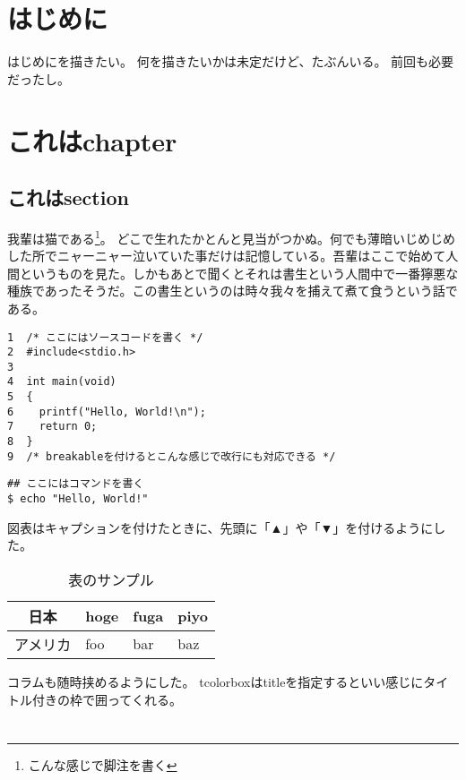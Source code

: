 \documentclass[11pt,dvipdfmx,b5paper,oneside]{jsbook}
\begin{document}
\chapter*{はじめに}
はじめにを描きたい。
何を描きたいかは未定だけど、たぶんいる。
前回も必要だったし。

\tableofcontents
\clearpage

\chapter{これはchapter}
\section{これはsection}
我輩は猫である\footnote{こんな感じで脚注を書く}。
どこで生れたかとんと見当がつかぬ。何でも薄暗いじめじめした所でニャーニャー泣いていた事だけは記憶している。吾輩はここで始めて人間というものを見た。しかもあとで聞くとそれは書生という人間中で一番獰悪な種族であったそうだ。この書生というのは時々我々を捕えて煮て食うという話である。
\begin{tcolorbox}[breakable]
\begin{verbatim}
1  /* ここにはソースコードを書く */
2  #include<stdio.h>
3
4  int main(void)
5  {
6    printf("Hello, World!\n");
7    return 0;
8  }
9  /* breakableを付けるとこんな感じで改行にも対応できる */
\end{verbatim}
\end{tcolorbox}
\begin{shaded}
\begin{verbatim}
## ここにはコマンドを書く
$ echo "Hello, World!"
\end{verbatim}
\end{shaded}
図表はキャプションを付けたときに、先頭に「▲」や「▼」を付けるようにした。
\begin{table}[H]
  \centering
  \caption{表のサンプル}
  \begin{tabular}{|c|l|l|l|} \hline
    日本 & hoge & fuga & piyo \\ \hline
    アメリカ & foo & bar & baz \\ \hline
  \end{tabular}
  \label{table-sample}
\end{table}
\begin{tcolorbox}[title=これはコラム]
  コラムも随時挟めるようにした。
  tcolorboxはtitleを指定するといい感じにタイトル付きの枠で囲ってくれる。
\end{tcolorbox}

\chapter*{}
\end{document}
